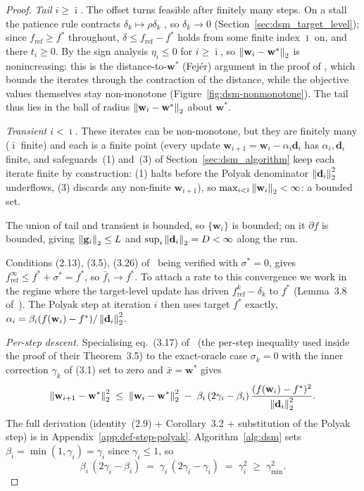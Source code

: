 \begin{proof}
\emph{Tail $i\ge\bar\imath$.} The offset turns feasible after finitely many steps. On a stall the patience rule contracts $\delta_k\mapsto\rho\delta_k$ \cite[Lemma~3.8]{dantonio2009deflected}, so $\delta_k\to 0$ (Section~\ref{sec:dsm_target_level}); since $f_{\mathrm{ref}}\ge f^*$ throughout, $\delta\le f_{\mathrm{ref}}-f^*$ holds from some finite index $\bar\imath$ on, and there $t_i\ge 0$. By the sign analysis $\eta_i\le 0$ for $i\ge\bar\imath$, so $\left\lVert \mathbf{w}_i-\mathbf{w}^* \right\rVert_2$ is nonincreasing: this is the distance-to-$\mathbf{w}^*$ (Fej\'er) argument in the proof of \cite[Theorem~3.5]{dantonio2009deflected}, which bounds the iterates through the contraction of the distance, while the objective values themselves stay non-monotone (Figure~\ref{fig:dsm-nonmonotone}). The tail thus lies in the ball of radius $\left\lVert \mathbf{w}_{\bar\imath}-\mathbf{w}^* \right\rVert_2$ about $\mathbf{w}^*$.

\emph{Transient $i<\bar\imath$.} These iterates can be non-monotone, but they are finitely many ($\bar\imath$ finite) and each is a finite point (every update $\mathbf{w}_{i+1}=\mathbf{w}_i-\alpha_i\mathbf{d}_i$ has $\alpha_i,\mathbf{d}_i$ finite, and safeguards~(1) and~(3) of Section~\ref{sec:dsm_algorithm} keep each iterate finite by construction: (1) halts before the Polyak denominator $\left\lVert \mathbf{d}_i \right\rVert_2^2$ underflows, (3) discards any non-finite $\mathbf{w}_{i+1}$), so $\max_{i<\bar\imath}\left\lVert \mathbf{w}_i \right\rVert_2<\infty$: a bounded set.

The union of tail and transient is bounded, so $\{\mathbf{w}_i\}$ is bounded; on it $\partial f$ is bounded, giving $\left\lVert \mathbf{g}_i \right\rVert_2 \le L$ and $\sup_i\left\lVert \mathbf{d}_i \right\rVert_2 = D < \infty$ along the run.

Conditions (2.13), (3.5), (3.26) of~\cite{dantonio2009deflected} being verified with $\sigma^* = 0$, \cite[Theorem~3.7]{dantonio2009deflected} gives $f^\infty_{\mathrm{ref}} \le f^* + \sigma^* = f^*$, so $\bar f_i \to f^*$. To attach a rate to this convergence we work in the regime where the target-level update has driven $f^k_{\mathrm{ref}} - \delta_k$ to $f^*$ (Lemma~3.8 of~\cite{dantonio2009deflected}). The Polyak step at iteration $i$ then uses target $f^*$ exactly, $\alpha_i = \beta_i(f(\mathbf{w}_i) - f^*)/\left\lVert \mathbf{d}_i \right\rVert_2^2$.

\emph{Per-step descent.} Specialising eq.~(3.17) of~\cite{dantonio2009deflected} (the per-step inequality used inside the proof of their Theorem~3.5) to the exact-oracle case $\sigma_k = 0$ with the inner correction $\gamma_k$ of (3.1) set to zero and $\bar x = \mathbf{w}^*$ gives
\begin{equation}
\label{eq:def-step-polyak}
\left\lVert \mathbf{w}_{i+1} - \mathbf{w}^* \right\rVert_2^2 \;\le\; \left\lVert \mathbf{w}_i - \mathbf{w}^* \right\rVert_2^2 \;-\; \beta_i\,(2\gamma_i - \beta_i)\,\frac{(f(\mathbf{w}_i) - f^*)^2}{\left\lVert \mathbf{d}_i \right\rVert_2^2}.
\end{equation}
The full derivation (identity~(2.9) + Corollary~3.2 + substitution of the Polyak step) is in Appendix~\ref{app:def-step-polyak}. Algorithm~\ref{alg:dsm} sets $\beta_i = \min(1, \gamma_i) = \gamma_i$ since $\gamma_i \le 1$, so
\[
\beta_i\,(2\gamma_i - \beta_i) \;=\; \gamma_i\,(2\gamma_i - \gamma_i) \;=\; \gamma_i^{2} \;\ge\; \gamma_{\min}^{2}.
\]


\end{proof}
